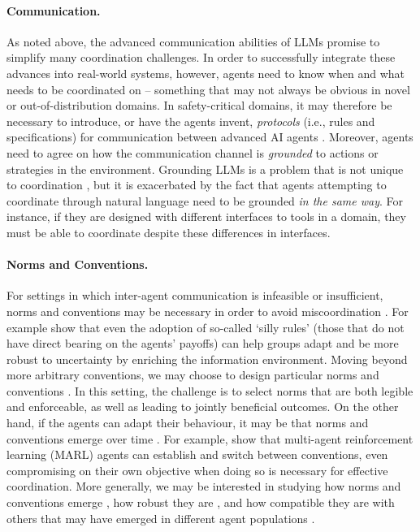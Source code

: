 \paragraph{Communication.}
As noted above, the advanced {communication} abilities of LLMs promise to simplify many coordination challenges.
In order to successfully integrate these advances into real-world systems, however, agents need to know when and what needs to be coordinated on -- something that may not always be obvious in novel or out-of-distribution domains.
In safety-critical domains, it may therefore be necessary to introduce, or have the agents invent, \emph{protocols} (i.e., rules and specifications) for communication between advanced AI agents \citep{Marro2024}. 
Moreover, agents need to agree on how the communication channel is \textit{grounded} \citep{clark_grounding_1991} to actions or strategies in the environment. Grounding LLMs is a problem that is not unique to coordination \citep{bisk_experience_2020, bender_climbing_2020, mahowald_dissociating_2023}, but it is exacerbated by the fact that agents attempting to coordinate through natural language need to be grounded \textit{in the same way}. For instance, if they are designed with different interfaces to tools in a domain, they must be able to coordinate despite these differences in interfaces.

\paragraph{Norms and Conventions.}
For settings in which inter-agent communication is infeasible or insufficient, {norms and conventions} may be necessary in order to avoid miscoordination \citep{leibo2024theory}.
For example \citet{hadfield2019legible} show that even the adoption of so-called `silly rules' (those that do not have direct bearing on the agents' payoffs) can help groups adapt and be more robust to uncertainty by enriching the information environment.
Moving beyond more arbitrary conventions, we may choose to design particular norms and conventions \citep{nyborg2016social, bicchieri2016norms, Shoham1992}. In this setting, the challenge is to select norms that are both legible and enforceable, as well as leading to jointly beneficial outcomes.
On the other hand, if the agents can adapt their behaviour, it may be that norms and conventions emerge over time \citep{mcelreath2003shared}.
For example, \citet{Koester2020} show that multi-agent reinforcement learning (MARL) agents can establish and switch between conventions, even compromising on their own objective when doing so is necessary for effective coordination.
More generally, we may be interested in studying how norms and conventions emerge \citep{Mashayekhi2022, Morris-Martin2019}, how robust they are \citep{lerer2019, Hao2017}, and how compatible they are with others that may have emerged in different agent populations \citep{Stastny2021}.

